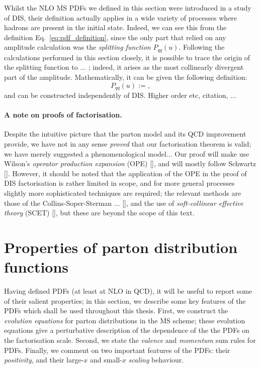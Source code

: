 \documentclass[withindex,glossary]{cam-thesis}
\begin{document}
Whilst the NLO $\overline{\text{MS}}$ PDFs we defined in this section were introduced in a study of DIS, their definition actually applies in a wide variety of processes where hadrons are present in the initial state. Indeed, we can see this from the definition Eq.~\eqref{eq:pdf_definition}, since the only part that relied on any amplitude calculation was the \textit{splitting function} $P_{qq}(u)$. Following the calculations performed in this section closely, it is possible to trace the origin of the splitting function to ... ; indeed, it arises as the most collinearly divergent part of the amplitude. Mathematically, it can be given the following definition:
\begin{equation}
P_{qq}(u) := ,
\end{equation}
and can be constructed independently of DIS. Higher order etc, citation, ...


\paragraph{A note on proofs of factorisation.} Despite the intuitive picture that the parton model and its QCD improvement provide, we have not in any sense \textit{proved} that our factorisation theorem is valid; we have merely suggested a phenomenological model... Our proof will make use Wilson's \textit{operator production expansion} (OPE) [], and will mostly follow Schwartz []. However, it should be noted that the application of the OPE in the proof of DIS factorisation is rather limited in scope, and for more general processes slightly more sophisticated techniques are required; the relevant methods are those of the Collins-Soper-Sterman ... [], and the use of \textit{soft-collinear effective theory} (SCET) [], but these are beyond the scope of this text.




\newpage
\section{Properties of parton distribution functions}
\label{sec:pdfproperties}
Having defined PDFs (at least at NLO in QCD), it will be useful to report some of their salient properties; in this section, we describe some key features of the PDFs which shall be used throughout this thesis. First, we construct the \textit{evolution equations} for parton distributions in the $\overline{\text{MS}}$ scheme; these evolution equations give a perturbative description of the dependence of the the PDFs on the factorisation scale. Second, we state the \textit{valence} and \textit{momentum} sum rules for PDFs. Finally, we comment on two important features of the PDFs: their \textit{positivity}, and their large-$x$ and small-$x$ \textit{scaling} behaviour.
\end{document}
